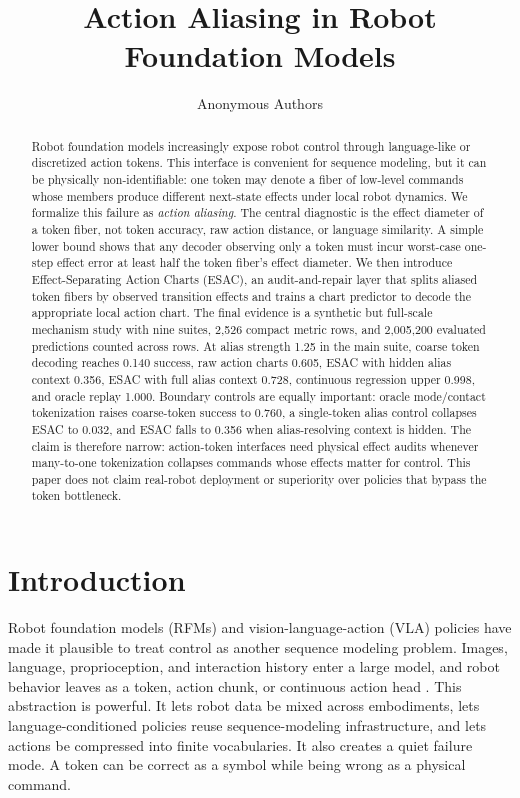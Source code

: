 \documentclass{article}
\title{Action Aliasing in Robot Foundation Models}
\author{Anonymous Authors}
\begin{document}
\maketitle

\begin{abstract}
Robot foundation models increasingly expose robot control through language-like
or discretized action tokens. This interface is convenient for sequence
modeling, but it can be physically non-identifiable: one token may denote a
fiber of low-level commands whose members produce different next-state effects
under local robot dynamics. We formalize this failure as \emph{action aliasing}.
The central diagnostic is the effect diameter of a token fiber, not token
accuracy, raw action distance, or language similarity. A simple lower bound
shows that any decoder observing only a token must incur worst-case one-step
effect error at least half the token fiber's effect diameter. We then introduce
Effect-Separating Action Charts (ESAC), an audit-and-repair layer that splits
aliased token fibers by observed transition effects and trains a chart predictor
to decode the appropriate local action chart. The final evidence is a synthetic
but full-scale mechanism study with nine suites, 2,526 compact metric rows, and
2,005,200 evaluated predictions counted across rows. At alias strength 1.25 in
the main suite, coarse token decoding reaches 0.140 success, raw action charts
0.605, ESAC with hidden alias context 0.356, ESAC with full alias context 0.728,
continuous regression upper 0.998, and oracle replay 1.000. Boundary controls
are equally important: oracle mode/contact tokenization raises coarse-token
success to 0.760, a single-token alias control collapses ESAC to 0.032, and ESAC
falls to 0.356 when alias-resolving context is hidden. The claim is therefore
narrow: action-token interfaces need physical effect audits whenever many-to-one
tokenization collapses commands whose effects matter for control. This paper
does not claim real-robot deployment or superiority over policies that bypass
the token bottleneck.
\end{abstract}

\section{Introduction}

Robot foundation models (RFMs) and vision-language-action (VLA) policies have
made it plausible to treat control as another sequence modeling problem. Images,
language, proprioception, and interaction history enter a large model, and robot
behavior leaves as a token, action chunk, or continuous action head
\citep{brohan2023rt1,brohan2023rt2,openx2023rtx,kim2024openvla,octo2024,black2024pi0}.
This abstraction is powerful. It lets robot data be mixed across embodiments,
lets language-conditioned policies reuse sequence-modeling infrastructure, and
lets actions be compressed into finite vocabularies. It also creates a quiet
failure mode. A token can be correct as a symbol while being wrong as a physical
command.
\end{document}
